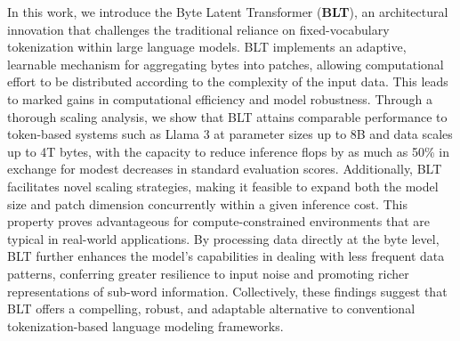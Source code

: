 In this work, we introduce the Byte Latent Transformer (\textbf{BLT}), an architectural innovation that challenges the traditional reliance on fixed-vocabulary tokenization within large language models. {\textsc BLT} implements an adaptive, learnable mechanism for aggregating bytes into patches, allowing computational effort to be distributed according to the complexity of the input data. This leads to marked gains in computational efficiency and model robustness. Through a thorough scaling analysis, we show that {\textsc BLT} attains comparable performance to token-based systems such as Llama 3 at parameter sizes up to 8B and data scales up to 4T bytes, with the capacity to reduce inference flops by as much as 50\% in exchange for modest decreases in standard evaluation scores. Additionally, {\textsc BLT} facilitates novel scaling strategies, making it feasible to expand both the model size and patch dimension concurrently within a given inference cost. This property proves advantageous for compute-constrained environments that are typical in real-world applications. By processing data directly at the byte level, {\textsc BLT} further enhances the model’s capabilities in dealing with less frequent data patterns, conferring greater resilience to input noise and promoting richer representations of sub-word information. Collectively, these findings suggest that {\textsc BLT} offers a compelling, robust, and adaptable alternative to conventional tokenization-based language modeling frameworks.

